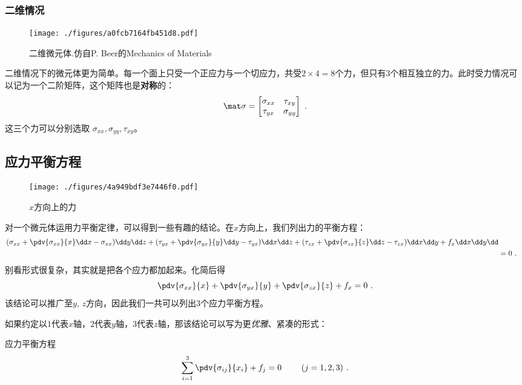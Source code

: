 \subsubsection{二维情况}
\begin{figure}[ht]
\centering
\texttt{[image: ./figures/a0fcb7164fb451d8.pdf]}
\caption{二维微元体.仿自P. Beer的Mechanics of Materials} \label{fig_STRESS_2}
\end{figure}

二维情况下的微元体更为简单。每一个面上只受一个正应力与一个切应力，共受$2\times4=8$个力，但只有$3$个相互独立的力。此时受力情况可以记为一个二阶矩阵，这个矩阵也是\textbf{对称}的：
\begin{equation}
\mat \sigma=
\begin{bmatrix}
\sigma_{xx} & \tau_{xy}\\
\tau_{yx} & \sigma_{yy}\\
\end{bmatrix}~.
\end{equation}
这三个力可以分别选取 $\sigma_{xx}, \sigma_{yy}, \tau_{xy}$。

\subsection{应力平衡方程}
\begin{figure}[ht]
\centering
\texttt{[image: ./figures/4a949bdf3e7446f0.pdf]}
\caption{$x$方向上的力} \label{fig_STRESS_7}
\end{figure}
对一个微元体运用力平衡定律，可以得到一些有趣的结论。在$x$方向上，我们列出力的平衡方程：
$$
\begin{aligned}
(\sigma_{xx} + \pdv{\sigma_{xx}}{x} \dd x - \sigma_{xx})\dd y \dd z
+ (\tau_{yx} + \pdv{\sigma_{yx}}{y} \dd y - \tau_{yx}) \dd x \dd z
+ (\tau_{zx} + \pdv{\sigma_{zx}}{z} \dd z - \tau_{zx}) \dd x \dd y 
+ f_x \dd x \dd y \dd \\
&= 0~.
\end{aligned}$$
别看形式很复杂，其实就是把各个应力都加起来。化简后得
$$
\pdv{\sigma_{xx}}{x} + \pdv{\sigma_{yx}}{y} + \pdv{\sigma_{zx}}{z} + f_x = 0~.
$$
该结论可以推广至$y$, $z$方向，因此我们一共可以列出$3$个应力平衡方程。

如果约定以$1$代表$x$轴，$2$代表$y$轴，$3$代表$z$轴，那该结论可以写为更\textsl{优雅}、紧凑的形式：
\begin{theorem}{应力平衡方程}
$$
\sum_{i=1}^3 \pdv{\sigma_{ij}}{x_i} + f_j=0~ \qquad (j=1,2,3)~.
$$
\end{theorem}

